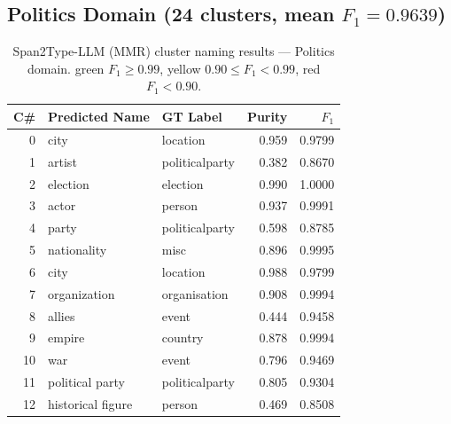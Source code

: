 \documentclass[11pt,a4paper]{article}
\begin{document}
\FloatBarrier

\subsection{Politics Domain (24 clusters, mean $F_1 = 0.9639$)}

\begin{table}[ht]
\centering
\small
\caption{Span2Type-LLM (MMR) cluster naming results --- Politics domain.
\colorbox{green!15}{green} $F_1 \geq 0.99$,
\colorbox{yellow!25}{yellow} $0.90 \leq F_1 < 0.99$,
\colorbox{red!15}{red} $F_1 < 0.90$.}
\label{tab:naming_politics}
\setlength{\tabcolsep}{5pt}
\begin{tabular}{r l l r r}
\toprule
\textbf{C\#} & \textbf{Predicted Name} & \textbf{GT Label} & \textbf{Purity} & \textbf{$F_1$} \\
\midrule
   0 & city                           & location               & 0.959 & \cellcolor{yellow!25}0.9799 \\
   1 & artist                         & politicalparty         & 0.382 & \cellcolor{red!15}0.8670 \\
   2 & election                       & election               & 0.990 & \cellcolor{green!15}1.0000 \\
   3 & actor                          & person                 & 0.937 & \cellcolor{green!15}0.9991 \\
   4 & party                          & politicalparty         & 0.598 & \cellcolor{red!15}0.8785 \\
   5 & nationality                    & misc                   & 0.896 & \cellcolor{green!15}0.9995 \\
   6 & city                           & location               & 0.988 & \cellcolor{yellow!25}0.9799 \\
   7 & organization                   & organisation           & 0.908 & \cellcolor{green!15}0.9994 \\
   8 & allies                         & event                  & 0.444 & \cellcolor{yellow!25}0.9458 \\
   9 & empire                         & country                & 0.878 & \cellcolor{green!15}0.9994 \\
  10 & war                            & event                  & 0.796 & \cellcolor{yellow!25}0.9469 \\
  11 & political party                & politicalparty         & 0.805 & \cellcolor{yellow!25}0.9304 \\
  12 & historical figure              & person                 & 0.469 & \cellcolor{red!15}0.8508 \\

\end{tabular}
\end{table}
\end{document}
